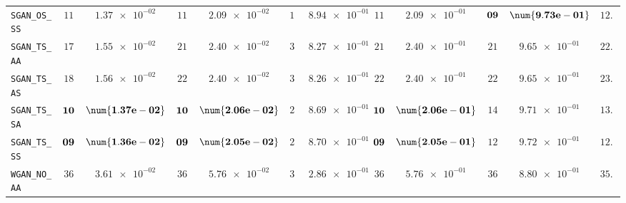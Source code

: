 \begin{xltabular}{\textwidth}{l||cC|cC|cC|cC|cC||c}
	\texttt{SGAN\_OS\_SS} & $ 11$ & $ \num{1.37e-02}$ & $ 11$ & $ \num{2.09e-02}$ & $ 18$ & $ \num{8.94e-01}$ & $ 11$ & $ \num{2.09e-01}$ & $\bf 09$ & $\bf \num{9.73e-01}$ & $ 12.0$  \\
	\texttt{SGAN\_TS\_AA} & $ 17$ & $ \num{1.55e-02}$ & $ 21$ & $ \num{2.40e-02}$ & $ 31$ & $ \num{8.27e-01}$ & $ 21$ & $ \num{2.40e-01}$ & $ 21$ & $ \num{9.65e-01}$ & $ 22.2$  \\
	\texttt{SGAN\_TS\_AS} & $ 18$ & $ \num{1.56e-02}$ & $ 22$ & $ \num{2.40e-02}$ & $ 32$ & $ \num{8.26e-01}$ & $ 22$ & $ \num{2.40e-01}$ & $ 22$ & $ \num{9.65e-01}$ & $ 23.2$  \\
	\texttt{SGAN\_TS\_SA} & $\bf 10$ & $\bf \num{1.37e-02}$ & $\bf 10$ & $\bf \num{2.06e-02}$ & $ 22$ & $ \num{8.69e-01}$ & $\bf 10$ & $\bf \num{2.06e-01}$ & $ 14$ & $ \num{9.71e-01}$ & $ 13.2$  \\
	\texttt{SGAN\_TS\_SS} & $\bf 09$ & $\bf \num{1.36e-02}$ & $\bf 09$ & $\bf \num{2.05e-02}$ & $ 21$ & $ \num{8.70e-01}$ & $\bf 09$ & $\bf \num{2.05e-01}$ & $ 12$ & $ \num{9.72e-01}$ & $ 12.0$  \\ \midrule
	\texttt{WGAN\_NO\_AA} & $ 36$ & $ \num{3.61e-02}$ & $ 36$ & $ \num{5.76e-02}$ & $ 35$ & $ \num{2.86e-01}$ & $ 36$ & $ \num{5.76e-01}$ & $ 36$ & $ \num{8.80e-01}$ & $ 35.8$  \\

\end{xltabular}
